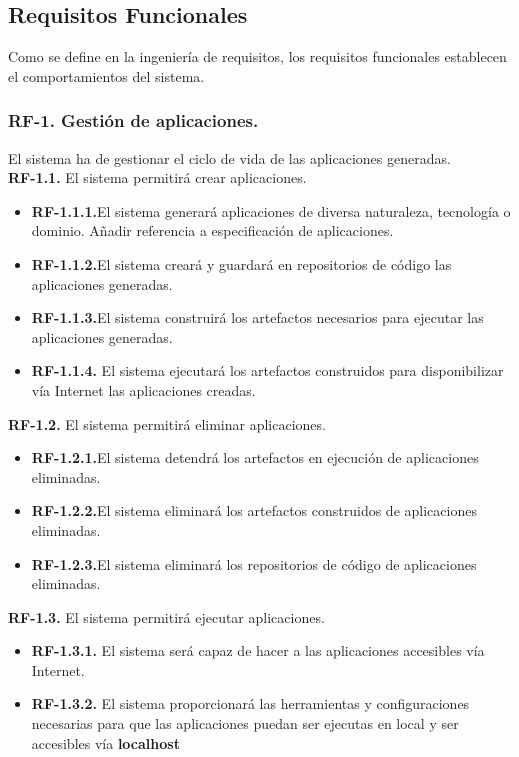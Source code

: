 \documentclass[a4paper,11pt]{book}
\begin{document}
\subsection{Requisitos Funcionales }
Como se define en la ingeniería de requisitos, los requisitos funcionales establecen el comportamientos del sistema.\\



\subsubsection { \textbf{ RF-1. Gestión de aplicaciones.}} El sistema ha de gestionar el ciclo de vida de las aplicaciones generadas.\\
   
\textbf{RF-1.1.} El sistema permitirá crear aplicaciones.
\begin{itemize}
 \item 	\textbf{RF-1.1.1.}El sistema generará aplicaciones de diversa naturaleza, tecnología o dominio. Añadir referencia a especificación de aplicaciones. 
 \item 	\textbf{RF-1.1.2.}El sistema creará y  guardará en repositorios de código las aplicaciones generadas.
  \item \textbf{RF-1.1.3.}El sistema construirá los artefactos necesarios para ejecutar las aplicaciones generadas.
   \item  \textbf{RF-1.1.4.} El sistema ejecutará los artefactos construidos para disponibilizar vía Internet las aplicaciones creadas. \\
\end{itemize}


\textbf{RF-1.2.} El sistema permitirá eliminar aplicaciones.
\begin{itemize}
 \item 	\textbf{RF-1.2.1.}El sistema detendrá los artefactos en ejecución de aplicaciones eliminadas. 
  \item 	\textbf{RF-1.2.2.}El sistema eliminará los artefactos construidos de aplicaciones eliminadas. 
   \item  \textbf{RF-1.2.3.}El sistema eliminará los repositorios de código de aplicaciones eliminadas.	\\
\end{itemize}

	
\textbf{RF-1.3.} El sistema permitirá ejecutar aplicaciones.
\begin{itemize}
 \item \textbf{RF-1.3.1.} El sistema será capaz de hacer a las aplicaciones accesibles vía Internet.  
 \item  \textbf{RF-1.3.2.} El sistema proporcionará las herramientas  y configuraciones necesarias para que las aplicaciones puedan ser ejecutas en local y ser accesibles vía \textbf{localhost}  \\
\end{itemize}
\end{document}
